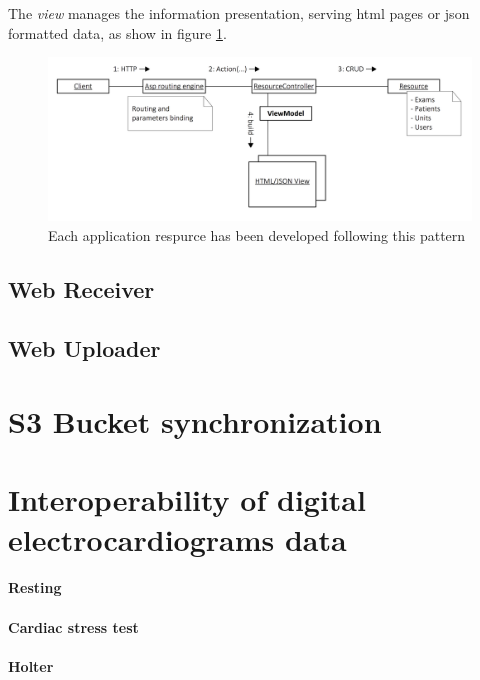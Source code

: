 The \textit{view} manages the information presentation, serving html pages or json formatted data, as show in figure \ref{fig:app_resource_pattern}.\\
\begin{figure}
    \includegraphics[width=\textwidth]{img/app_resource_pattern}
    \caption{Each application respurce has been developed following this pattern}
    \label{fig:app_resource_pattern}
\end{figure}

\subsection{Web Receiver}
\label{subsection:webreceiver}
\subsection{Web Uploader}
\section{S3 Bucket synchronization}
\section{Interoperability of digital electrocardiograms data}
\paragraph{Resting}
\label{paragraph:Resting}
\paragraph{Cardiac stress test}
\label{paragraph:Cardiac stress test}
\paragraph{Holter}
\label{paragraph:Holter}

